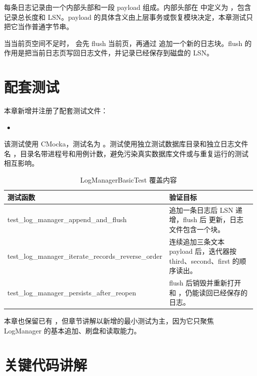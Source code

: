 每条日志记录由一个内部头部和一段 payload 组成。内部头部在  中定义为 ，包含记录总长度和 LSN。payload 的具体含义由上层事务或恢复模块决定，本章测试只把它当作普通字节串。

当当前页空间不足时， 会先 flush 当前页，再通过  追加一个新的日志块。flush 的作用是把当前日志页写回日志文件，并记录已经保存到磁盘的 LSN。

\section{配套测试}
\label{sec:log-test}

本章新增并注册了配套测试文件：

\begin{itemize}
  \item {}
\end{itemize}

该测试使用 CMocka，测试名为 。测试使用独立测试数据库目录和独立日志文件名 ，目录名带进程号和用例计数，避免污染真实数据库文件或与重复运行的测试相互影响。

\begin{table}[htbp]
  \centering
  \caption{LogManagerBasicTest 覆盖内容}
  \label{tab:log-tests}
  \begin{tabularx}{\textwidth}{>{\ttfamily}l Y}
    \toprule
    测试函数 & 验证目标 \\
    \midrule
    test\_log\_manager\_append\_and\_flush & 追加一条日志后 LSN 递增，flush 后  更新，日志文件包含一个块。\\
    test\_log\_manager\_iterate\_records\_reverse\_order & 连续追加三条文本 payload 后，迭代器按 third、second、first 的顺序读出。\\
    test\_log\_manager\_persists\_after\_reopen & flush 后销毁并重新打开  和 ，仍能读回已经保存的日志。\\
    \bottomrule
  \end{tabularx}
\end{table}

本章也保留已有 ，但章节讲解以新增的最小测试为主，因为它只聚焦 LogManager 的基本追加、刷盘和读取能力。

\section{关键代码讲解}
\label{sec:log-code}

